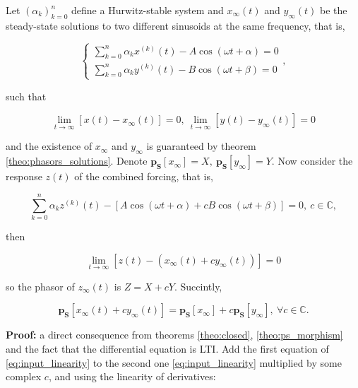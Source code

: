 \begin{theorem}\label{theo:spo_linear} %
	Let $\left(\alpha_k\right)_{k=0}^n$ define a Hurwitz-stable system and $x_\infty(t)$ and $y_\infty(t)$ be the steady-state solutions to two different sinusoids at the same frequency, that is,

\begin{equation} \left\{ \begin{array}{l} \sum\limits_{k=0}^n \alpha_k x^{(k)}(t) - A\cos\left(\omega t + \alpha\right) = 0 \\[3mm] \sum\limits_{k=0}^n \alpha_k y^{(k)}(t) - B\cos\left(\omega t + \beta\right) = 0 \end{array}\right. , \label{eq:input_linearity}\end{equation}

	\noindent such that

\begin{equation} \lim\limits_{t\to\infty} \left[x(t) - x_\infty(t)\right] = 0,\ \lim\limits_{t\to\infty} \left[y(t) - y_\infty(t)\right] = 0 \end{equation}

	\noindent and the existence of $x_\infty$ and $y_\infty$ is guaranteed by theorem \ref{theo:phasors_solutions}. Denote $\mathbf{p_S}\left[x_\infty\right] = X,\ \mathbf{p_S}\left[y_\infty\right] = Y$. Now consider the response $z(t)$ of the combined forcing, that is,

\begin{equation} \sum\limits_{k=0}^n \alpha_k z^{(k)}(t) - \left[A\cos\left(\omega t + \alpha\right) + c B\cos\left(\omega t + \beta\right)\right] = 0,\ c\in\mathbb{C}, \end{equation}

	\noindent then 

\begin{equation} \lim\limits_{t\to\infty} \left[z(t) - \left(x_\infty(t) + cy_\infty(t)\right)\right] = 0 \end{equation}

	\noindent so the phasor of $z_\infty(t)$ is $Z = X + cY$. Succintly, 

\begin{equation} \mathbf{p_S}\left[x_\infty(t) + c y_\infty(t)\right] = \mathbf{p_S}\left[x_\infty\right] + c \mathbf{p_S}\left[y_\infty\right],\ \forall c \in\mathbb{C}. \end{equation}
\end{theorem}
\noindent\textbf{Proof:} a direct consequence from theorems \ref{theo:closed}, \ref{theo:ps_morphism} and the fact that the differential equation is LTI. Add the first equation of \eqref{eq:input_linearity} to the second one \eqref{eq:input_linearity} multiplied by some complex $c$, and using the linearity of derivatives:

